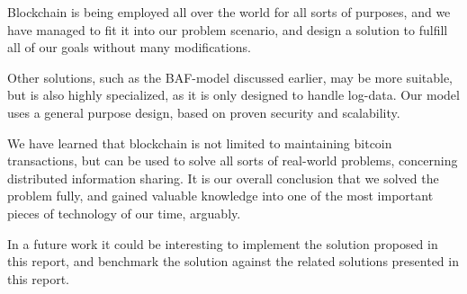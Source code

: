 
Blockchain is being employed all over the world for all sorts of
purposes, and we have managed to fit it into our problem scenario, and
design a solution to fulfill all of our goals without many
modifications.

Other solutions, such as the BAF-model discussed earlier, may be more
suitable, but is also highly specialized, as it is only designed to
handle log-data. Our model uses a general purpose design, based on
proven security and scalability.

We have learned that blockchain is not limited to maintaining bitcoin
transactions, but can be used to solve all sorts of real-world
problems, concerning distributed information sharing. It is our
overall conclusion that we solved the problem fully, and gained
valuable knowledge into one of the most important pieces of technology
of our time, arguably.

In a future work it could be interesting to implement the solution proposed in this report, and benchmark the solution against the related solutions presented in this report.